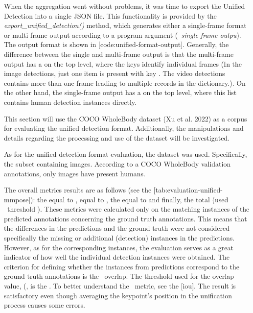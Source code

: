 When the aggregation went without problems, it was time to export the Unified Detection into a single JSON file. This functionality is provided by the {\it export_unified_detection()} method, which generates either a single-frame format or multi-frame output according to a program argument ({\it --single-frame-outpu}). The output format is shown in [code:unified-format-output]. Generally, the difference between the single and multi-frame output is that the multi-frame output has a  on the top level, where the keys identify individual frames (In the image detections, just one item is present with key . The video detections contains more than one frame leading to multiple records in the dictionary.). On the other hand, the single-frame output has a  on the top level, where this list contains human detection instances directly.


\page
This section will use the COCO WholeBody dataset (Xu et al. 2022) as a corpus for evaluating the unified detection format. Additionally, the manipulations and details regarding the processing and use of the dataset will be investigated.

As for the unified detection format evaluation, the  dataset was used. Specifically, the  subset containing  images. According to a COCO WholeBody validation annotations, only  images have present humans. 

The overall metrics results are as follows (see the [tab:evaluation-unified-mmpose]): the \pojem{\OKS} equal to , \pojem{\APE} equal to , the \pojem{\MSE} equal to  and finally, the total   (used \OKS\ threshold ). These metrics were calculated only on the matching instances of the predicted annotations concerning the ground truth annotations. This means that the differences in the predictions and the ground truth were not considered—specifically the missing or additional (detection) instances in the predictions. However, as for the corresponding instances, the evaluation serves as a great indicator of how well the individual detection instances were obtained. The criterion for defining whether the instances from predictions correspond to the ground truth annotations is the \BBOX\ overlap. The threshold used for the overlap value,  (\IoU\), is the . To better understand the \IoU\ metric, see the [iou]. The result is satisfactory even though averaging the keypoint's position in the unification process causes some errors.

